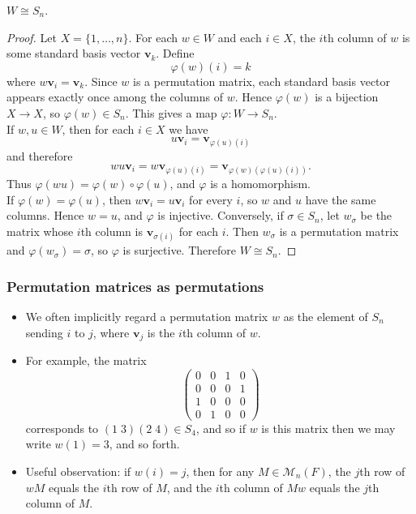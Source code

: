 \documentclass[../Odyssey_Project.tex]{subfiles}
\begin{document}
\begin{proposition}
\label{prop:4.5}
$W \cong S_n$.
\end{proposition}

\begin{proof}
Let $X=\{1,\ldots,n\}$. For each $w \in W$ and each $i \in X$, the $i$th column of $w$ is some standard basis vector $\mathbf{v}_k$. Define
\[
    \varphi(w)(i)=k
\]
where $w\mathbf{v}_i=\mathbf{v}_k$. Since $w$ is a permutation matrix, each standard basis vector appears exactly once among the columns of $w$. Hence $\varphi(w)$ is a bijection $X \to X$, so $\varphi(w) \in S_n$. This gives a map $\varphi \colon W \to S_n$.\\
If $w,u \in W$, then for each $i \in X$ we have
\[
    u\mathbf{v}_i=\mathbf{v}_{\varphi(u)(i)}
\]
and therefore
\[
    wu\mathbf{v}_i
    =w\mathbf{v}_{\varphi(u)(i)}
    =\mathbf{v}_{\varphi(w)(\varphi(u)(i))}.
\]
Thus $\varphi(wu)=\varphi(w)\circ\varphi(u)$, and $\varphi$ is a homomorphism.\\
If $\varphi(w)=\varphi(u)$, then $w\mathbf{v}_i=u\mathbf{v}_i$ for every $i$, so $w$ and $u$ have the same columns. Hence $w=u$, and $\varphi$ is injective. Conversely, if $\sigma \in S_n$, let $w_\sigma$ be the matrix whose $i$th column is $\mathbf{v}_{\sigma(i)}$ for each $i$. Then $w_\sigma$ is a permutation matrix and $\varphi(w_\sigma)=\sigma$, so $\varphi$ is surjective. Therefore $W \cong S_n$.
\end{proof}

\subsubsection*{Permutation matrices as permutations}
\begin{itemize}
    \item We often implicitly regard a permutation matrix $w$ as the element of $S_n$ sending $i$ to $j$, where $\mathbf{v}_j$ is the $i$th column of $w$.
    \item For example, the matrix
    \[
    \begin{pmatrix} 0 & 0 & 1 & 0 \\ 0 & 0 & 0 & 1 \\ 1 & 0 & 0 & 0 \\ 0 & 1 & 0 & 0 \end{pmatrix}
    \]
    corresponds to $(1\;3)(2\;4) \in S_4$, and so if $w$ is this matrix then we may write $w(1) = 3$, and so forth.
    \item Useful observation: if $w(i) = j$, then for any $M \in \mathcal{M}_n(F)$, the $j$th row of $wM$ equals the $i$th row of $M$, and the $i$th column of $Mw$ equals the $j$th column of $M$.
\end{itemize}
\end{document}
